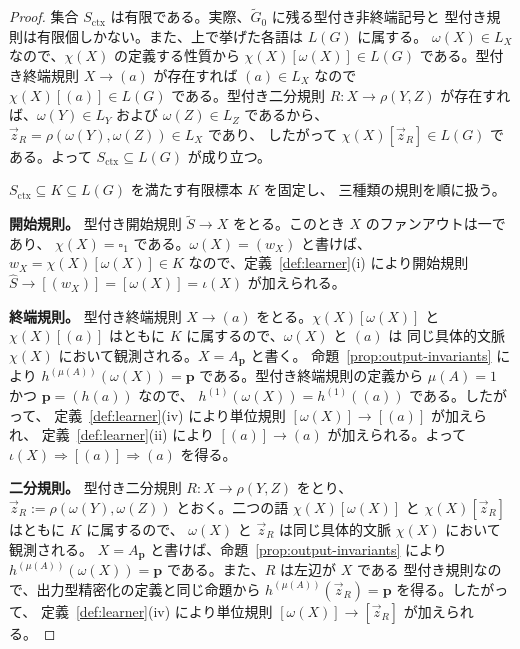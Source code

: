 \documentclass[11pt,a4paper]{ltjsarticle}
\theoremstyle{remark}
\newcommand{\tuple}[1]{\vec{#1}}
\newcommand{\blank}{\square}
\begin{document}
\begin{proof}
集合 \(S_{\mathrm{ctx}}\) は有限である。実際、\(\widetilde G_0\) に残る型付き非終端記号と
型付き規則は有限個しかない。また、上で挙げた各語は \(L(G)\) に属する。
\(\omega(X)\in L_X\) なので、\(\chi(X)\) の定義する性質から
\(\chi(X)[\omega(X)]\in L(G)\) である。型付き終端規則 \(X\to(a)\) が存在すれば
\((a)\in L_X\) なので \(\chi(X)[(a)]\in L(G)\) である。型付き二分規則
\(R\colon X\to\rho(Y,Z)\) が存在すれば、\(\omega(Y)\in L_Y\) および
\(\omega(Z)\in L_Z\) であるから、\(\tuple z_R=\rho(\omega(Y),\omega(Z))\in L_X\) であり、
したがって \(\chi(X)[\tuple z_R]\in L(G)\) である。よって
\(S_{\mathrm{ctx}}\subseteq L(G)\) が成り立つ。

\(S_{\mathrm{ctx}}\subseteq K\subseteq L(G)\) を満たす有限標本 \(K\) を固定し、
三種類の規則を順に扱う。

\medskip
\noindent
\textbf{開始規則。}
型付き開始規則 \(\widetilde S\to X\) をとる。このとき \(X\) のファンアウトは一であり、
\(\chi(X)=\blank_1\) である。\(\omega(X)=(w_X)\) と書けば、
\(w_X=\chi(X)[\omega(X)]\in K\) なので、定義~\ref{def:learner}(i) により開始規則
\(\widehat S\to[(w_X)]=[\omega(X)]=\iota(X)\) が加えられる。

\medskip
\noindent
\textbf{終端規則。}
型付き終端規則 \(X\to(a)\) をとる。\(\chi(X)[\omega(X)]\) と
\(\chi(X)[(a)]\) はともに \(K\) に属するので、\(\omega(X)\) と \((a)\) は
同じ具体的文脈 \(\chi(X)\) において観測される。\(X=A_{\mathbf p}\) と書く。
命題~\ref{prop:output-invariants} により
\(h^{(\mu(A))}(\omega(X))=\mathbf p\) である。型付き終端規則の定義から
\(\mu(A)=1\) かつ \(\mathbf p=(h(a))\) なので、
\(h^{(1)}(\omega(X))=h^{(1)}((a))\) である。したがって、
定義~\ref{def:learner}(iv) により単位規則 \([\omega(X)]\to[(a)]\) が加えられ、
定義~\ref{def:learner}(ii) により \([(a)]\to(a)\) が加えられる。よって
\(\iota(X)\Rightarrow[(a)]\Rightarrow(a)\) を得る。

\medskip
\noindent
\textbf{二分規則。}
型付き二分規則 \(R\colon X\to\rho(Y,Z)\) をとり、
\(\tuple z_R:=\rho(\omega(Y),\omega(Z))\) とおく。二つの語
\(\chi(X)[\omega(X)]\) と \(\chi(X)[\tuple z_R]\) はともに \(K\) に属するので、
\(\omega(X)\) と \(\tuple z_R\) は同じ具体的文脈 \(\chi(X)\) において観測される。
\(X=A_{\mathbf p}\) と書けば、命題~\ref{prop:output-invariants} により
\(h^{(\mu(A))}(\omega(X))=\mathbf p\) である。また、\(R\) は左辺が \(X\) である
型付き規則なので、出力型精密化の定義と同じ命題から
\(h^{(\mu(A))}(\tuple z_R)=\mathbf p\) を得る。したがって、
定義~\ref{def:learner}(iv) により単位規則
\([\omega(X)]\to[\tuple z_R]\) が加えられる。


\end{proof}
\end{document}
